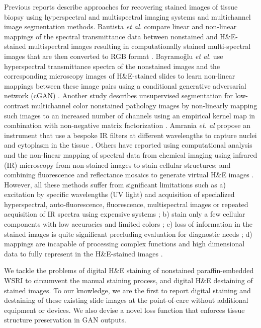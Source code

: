 \documentclass[10pt, conference, compsocconf]{IEEEtran}
\begin{document}
Previous reports describe approaches for recovering stained images of tissue biopsy using hyperspectral and multispectral imaging systems and multichannel image segmentation methods. Bautista \textit{et al.} compare linear and non-linear mappings of the spectral transmittance data between nonstained and H\&E-stained multispectral images resulting in computationally stained multi-spectral images that are then converted to RGB format \cite{bautista}. Bayramo\~glu \textit{et al.} use hyperspectral transmittance spectra of the nonstained images and the corresponding microscopy images of H\&E-stained slides to learn non-linear mappings between these image pairs using a conditional generative adversarial network (cGAN) \cite{bayramoglu}. Another study describes unsupervised segmentation for low-contrast multichannel color nonstained pathology images by non-linearly mapping such images to an increased number of channels using an empirical kernel map in combination with non-negative matrix factorization \cite{kopriva2015unsupervised}. Amrania \textit{et. al} propose an instrument that use a bespoke IR filters at different wavelengths to capture nuclei and cytoplasm in the tissue \cite{amrania2012digistain}. Others have reported using computational analysis and the non-linear mapping of spectral data from chemical imaging using infrared (IR) microscopy from non-stained images to stain cellular structures; and combining fluorescence and reflectance mosaics to generate virtual H\&E images \cite{mayerich2015stain,bini2011confocal}. However, all these methods suffer from significant limitations such as a) excitation by specific wavelengths (UV light) and acquisition of specialized hyperspectral, auto-fluorescence, fluorescence, multispectral images or repeated acquisition of IR spectra using expensive systems \cite{bautista,bayramoglu,kopriva2015unsupervised,mayerich2015stain,rivenson2018deep}; b) stain only a few cellular components with low accuracies and limited colors \cite{bautista}; c) loss of information in the stained images is quite significant precluding evaluation for diagnostic needs \cite{bayramoglu}; d) mappings are incapable of processing complex functions and high dimensional data to fully represent in the H\&E-stained images \cite{bautista,kopriva2015unsupervised,mayerich2015stain}. 

We tackle the problems of digital H\&E staining of nonstained paraffin-embedded WSRI to circumvent the manual staining process, and digital H\&E destaining of stained images. To our knowledge, we are the first to report digital staining and destaining of these existing slide images at the point-of-care without additional equipment or devices. We also devise a novel loss function that enforces tissue structure preservation in GAN outputs.
\end{document}
